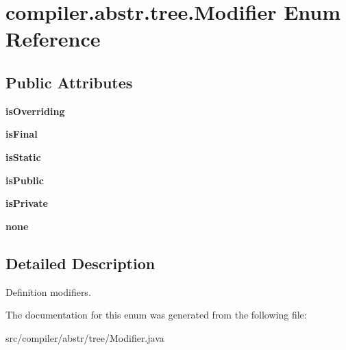 \hypertarget{enumcompiler_1_1abstr_1_1tree_1_1_modifier}{}\section{compiler.\+abstr.\+tree.\+Modifier Enum Reference}
\label{enumcompiler_1_1abstr_1_1tree_1_1_modifier}
\subsection*{Public Attributes}
\begin{DoxyCompactItemize}
\item 
\mbox{\label{enumcompiler_1_1abstr_1_1tree_1_1_modifier_a0a75f331eacc80eb8f0d1e813afdeacb}} 
{\bfseries is\+Overriding}
\item 
\mbox{\label{enumcompiler_1_1abstr_1_1tree_1_1_modifier_aa48901149c25351db127c22e25deb4d8}} 
{\bfseries is\+Final}
\item 
\mbox{\label{enumcompiler_1_1abstr_1_1tree_1_1_modifier_a20ba8ab524ed65463f96f63b82adbd2e}} 
{\bfseries is\+Static}
\item 
\mbox{\label{enumcompiler_1_1abstr_1_1tree_1_1_modifier_aa1e01b2b89f8b6c141358cfe930c84f4}} 
{\bfseries is\+Public}
\item 
\mbox{\label{enumcompiler_1_1abstr_1_1tree_1_1_modifier_a5da254703dd574afe55db053f863304a}} 
{\bfseries is\+Private}
\item 
\mbox{\label{enumcompiler_1_1abstr_1_1tree_1_1_modifier_ad9396477efd916d9699eaa9acb10c0ea}} 
{\bfseries none}
\end{DoxyCompactItemize}


\subsection{Detailed Description}
Definition modifiers. 

The documentation for this enum was generated from the following file\+:\begin{DoxyCompactItemize}
\item 
src/compiler/abstr/tree/Modifier.\+java\end{DoxyCompactItemize}
